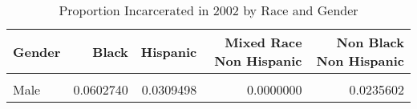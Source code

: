 \begin{table}[H]

\caption{\label{tab:tab:summarystats}Proportion Incarcerated in 2002 by Race and Gender}
\centering
\begin{tabular}[t]{lrrrr}
\toprule
Gender & Black & Hispanic & Mixed Race Non Hispanic & Non Black Non Hispanic\\
\midrule
\cellcolor{gray!6}{Female} & \cellcolor{gray!6}{0.0079225} & \cellcolor{gray!6}{0.0066225} & \cellcolor{gray!6}{0.0238095} & \cellcolor{gray!6}{0.0059798}\\
Male & 0.0602740 & 0.0309498 & 0.0000000 & 0.0235602\\
\bottomrule
\end{tabular}
\end{table}
